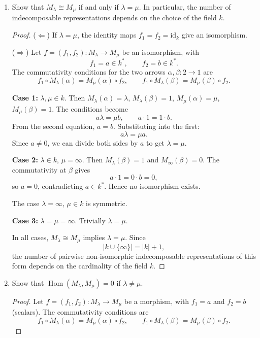 \documentclass[11pt, a4paper]{article}
\begin{document}
\begin{enumerate}[leftmargin=*, label=\textbf{\arabic*.}]
\begin{enumerate}[label=(\alph*)]
\begin{proof}
    In both cases, no such subrepresentation $N_2$ exists, so $M_\lambda$ is indecomposable.
    \end{proof}
    \item Show that $M_\lambda \cong M_\mu$ if and only if $\lambda = \mu$. In particular, the number of indecomposable representations depends on the choice of the field $k$.
    \begin{proof}
    ($\Leftarrow$) If $\lambda=\mu$, the identity maps $f_1=f_2=\mathrm{id}_k$ give an isomorphism.

    \medskip
    ($\Rightarrow$) Let $f=(f_1,f_2)\colon M_\lambda\to M_\mu$ be an isomorphism, with
    \[
    f_1 = a\in k^*,\qquad f_2 = b\in k^*.
    \]
    The commutativity conditions for the two arrows $\alpha,\beta\colon 2\to 1$ are
    \[
    f_1\circ M_\lambda(\alpha) = M_\mu(\alpha)\circ f_2,\qquad f_1\circ M_\lambda(\beta) = M_\mu(\beta)\circ f_2.
    \]

    \textbf{Case 1:} $\lambda,\mu\in k$. Then $M_\lambda(\alpha)=\lambda$, $M_\lambda(\beta)=1$, $M_\mu(\alpha)=\mu$, $M_\mu(\beta)=1$. The conditions become
    \[
    a\lambda = \mu b,\qquad a\cdot 1 = 1\cdot b.
    \]
    From the second equation, $a=b$. Substituting into the first:
    \[
    a\lambda = \mu a.
    \]
    Since $a\neq 0$, we can divide both sides by $a$ to get $\lambda=\mu$.

    \textbf{Case 2:} $\lambda\in k$, $\mu=\infty$. Then $M_\lambda(\beta)=1$ and $M_\infty(\beta)=0$. The commutativity at $\beta$ gives
    \[
    a\cdot 1 = 0\cdot b = 0,
    \]
    so $a=0$, contradicting $a\in k^*$. Hence no isomorphism exists.

    The case $\lambda=\infty$, $\mu\in k$ is symmetric.

    \textbf{Case 3:} $\lambda=\mu=\infty$. Trivially $\lambda=\mu$.

    \medskip
    In all cases, $M_\lambda\cong M_\mu$ implies $\lambda=\mu$. Since
    \[
    |k\cup\{\infty\}| = |k|+1,
    \]
    the number of pairwise non-isomorphic indecomposable representations of this form depends on the cardinality of the field $k$.
    \end{proof}
    \item Show that $\operatorname{Hom}(M_\lambda, M_\mu) = 0$ if $\lambda \neq \mu$.
    \begin{proof}
    Let $f=(f_1,f_2)\colon M_\lambda\to M_\mu$ be a morphism, with $f_1=a$ and $f_2=b$ (scalars). The commutativity conditions are
    \[
    f_1\circ M_\lambda(\alpha) = M_\mu(\alpha)\circ f_2,\qquad f_1\circ M_\lambda(\beta) = M_\mu(\beta)\circ f_2.
    \]


\end{proof}
\end{enumerate}
\end{enumerate}
\end{document}
